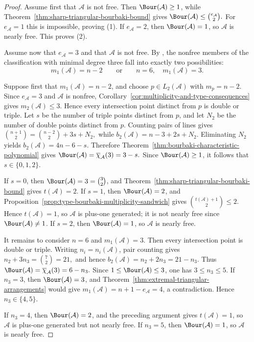 \documentclass[11pt]{amsart}   %
\theoremstyle{definition}
\def\A{{\mathcal A}}
\begin{document}
\begin{proof}
Assume first that $\A$ is not free. Then $\Bour(\A)\geq1$, while Theorem~\ref{thm:sharp-triangular-bourbaki-bound} gives $\Bour(\A)\leq\binom{e_\A}{2}.$ For $e_\A=1$ this is impossible, proving (1). If $e_\A=2$, then $\Bour(\A)=1$, so $\A$ is nearly free. This proves (2).

Assume now that $e_\A=3$ and that $\A$ is not free. By \cite[Theorem~2.6]{Burity-Tohaneanu}, the nonfree members of the
classification with minimal degree three fall into exactly two
possibilities:
\[
m_1(\A)=n-2
\qquad\text{or}\qquad
n=6,\quad m_1(\A)=3.
\]

Suppose first that $m_1(\A)=n-2$, and choose $p\in L_2(\A)$ with $m_p=n-2$. Since $e_\A=3$ and $\A$ is nonfree, Corollary~\ref{cor:multiplicity-and-type-consequences} gives $m_2(\A)\leq3$. Hence every intersection point distinct from $p$ is double or triple. Let $s$ be the number of triple points distinct from $p$, and let $N_2$ be the number of double points distinct from $p$. Counting pairs of lines gives $\binom{n+1}{2} = \binom{n-2}{2}+3s+N_2,$ while $b_2(\A)=n-3+2s+N_2.$ Eliminating $N_2$ yields $b_2(\A)=4n-6-s$. Therefore Theorem~\ref{thm:bourbaki-characteristic-polynomial} gives $\Bour(\A) =\overline{\chi}_\A(3) =3-s.$ Since $\Bour(\A)\geq1$, it follows that $s\in\{0,1,2\}$.

If $s=0$, then $\Bour(\A)=3=\binom32$, and Theorem~\ref{thm:sharp-triangular-bourbaki-bound} gives $t(\A)=2$. If $s=1$, then $\Bour(\A)=2$, and Proposition~\ref{prop:type-bourbaki-multiplicity-sandwich} gives $\binom{t(\A)+1}{2}\leq2$. Hence $t(\A)=1$, so $\A$ is plus-one generated; it is not nearly free since $\Bour(\A)\neq1$. If $s=2$, then $\Bour(\A)=1$, so $\A$ is nearly free.

It remains to consider $n=6$ and $m_1(\A)=3$. Then every intersection point is double or triple. Writing $n_i=n_i(\A)$, pair counting gives $n_2+3n_3=\binom72=21,$ and hence $b_2(\A)=n_2+2n_3=21-n_3$. Thus $\Bour(\A) =\overline{\chi}_\A(3) =6-n_3.$ Since $1\leq\Bour(\A)\leq3$, one has $3\leq n_3\leq5$. If $n_3=3$, then $\Bour(\A)=3$, and Theorem~\ref{thm:extremal-triangular-arrangements} would give $m_1(\A)=n+1-e_\A=4$, a contradiction. Hence $n_3\in\{4,5\}$.

If $n_3=4$, then $\Bour(\A)=2$, and the preceding argument gives $t(\A)=1$, so $\A$ is plus-one generated but not nearly free. If $n_3=5$, then $\Bour(\A)=1$, so $\A$ is nearly free.
\end{proof}
\end{document}
